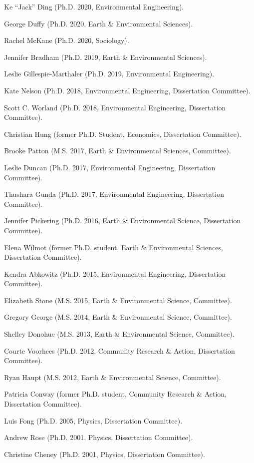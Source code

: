 \item Ke ``Jack'' Ding (Ph.D. 2020, Environmental Engineering).
\item George Duffy (Ph.D. 2020, Earth \& Environmental Sciences).
\item Rachel McKane (Ph.D. 2020, Sociology).
\item Jennifer Bradham (Ph.D. 2019, Earth \& Environmental Sciences).
\item Leslie Gillespie-Marthaler (Ph.D. 2019, Environmental Engineering).
\item Kate Nelson (Ph.D. 2018, Environmental Engineering, Dissertation Committee).
\item Scott C. Worland (Ph.D. 2018, Environmental Engineering, Dissertation Committee).
\item Christian Hung (former Ph.D. Student, Economics, Dissertation Committee).
\item Brooke Patton (M.S. 2017, Earth \& Environmental Sciences, Committee).
\item Leslie Duncan (Ph.D. 2017, Environmental Engineering, Dissertation Committee).
\item Thushara Gunda (Ph.D. 2017, Environmental Engineering, Dissertation Committee).
\item Jennifer Pickering (Ph.D. 2016, Earth \& Environmental Science, Dissertation Committee).
\item Elena Wilmot (former Ph.D. student, Earth \& Environmental Sciences, Dissertation Committee).
\item Kendra Abkowitz (Ph.D. 2015, Environmental Engineering, Dissertation Committee).
\item Elizabeth Stone (M.S. 2015, Earth \& Environmental Science, Committee).
\item Gregory George (M.S. 2014, Earth \& Environmental Science, Committee).
\item Shelley Donohue (M.S. 2013, Earth \& Environmental Science, Committee).
\item Courte Voorhees (Ph.D. 2012,  Community Research \& Action, Dissertation Committee).
\item Ryan Haupt (M.S. 2012, Earth \& Environmental Science, Committee).
\item Patricia Conway (former Ph.D. student, Community Research \& Action, Dissertation Committee).
\item Luis Fong (Ph.D. 2005, Physics, Dissertation Committee).
\item Andrew Rose (Ph.D. 2001, Physics, Dissertation Committee).
\item Christine Cheney (Ph.D. 2001, Physics, Dissertation Committee).
